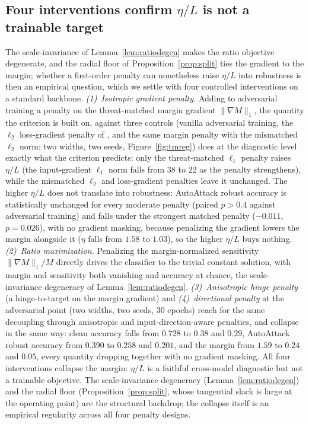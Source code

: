 \documentclass{article}
\theoremstyle{definition}
\begin{document}
\subsection{Four interventions confirm $\eta/L$ is not a trainable target}\label{app:tmreg}
The scale-invariance of Lemma~\ref{lem:ratiodegen} makes the ratio objective degenerate, and the radial floor of Proposition~\ref{prop:split} ties the gradient to the margin; whether a first-order penalty can nonetheless raise $\eta/L$ into robustness is then an empirical question, which we settle with four controlled interventions on a standard backbone. \emph{(1)~Isotropic gradient penalty.} Adding to adversarial training a penalty on the threat-matched margin gradient $\|\nabla M\|_1$, the quantity the criterion is built on, against three controls (vanilla adversarial training, the $\ell_2$ loss-gradient penalty of \citet{ross2018improving,finlay2021scaleable}, and the same margin penalty with the mismatched $\ell_2$ norm; two widths, two seeds, Figure~\ref{fig:tmreg}) does at the diagnostic level exactly what the criterion predicts: only the threat-matched $\ell_1$ penalty raises $\eta/L$ (the input-gradient $\ell_1$ norm falls from $38$ to $22$ as the penalty strengthens), while the mismatched $\ell_2$ and loss-gradient penalties leave it unchanged. The higher $\eta/L$ does not translate into robustness: AutoAttack robust accuracy is statistically unchanged for every moderate penalty (paired $p>0.4$ against adversarial training) and falls under the strongest matched penalty ($-0.011$, $p=0.026$), with no gradient masking, because penalizing the gradient lowers the margin alongside it ($\eta$ falls from $1.58$ to $1.03$), so the higher $\eta/L$ buys nothing. \emph{(2)~Ratio maximization.} Penalizing the margin-normalized sensitivity $\|\nabla M\|_1/M$ directly drives the classifier to the trivial constant solution, with margin and sensitivity both vanishing and accuracy at chance, the scale-invariance degeneracy of Lemma~\ref{lem:ratiodegen}. \emph{(3)~Anisotropic hinge penalty} (a hinge-to-target on the margin gradient) and \emph{(4)~directional penalty} at the adversarial point (two widths, two seeds, $30$ epochs) reach for the same decoupling through anisotropic and input-direction-aware penalties, and collapse in the same way: clean accuracy falls from $0.728$ to $0.38$ and $0.29$, AutoAttack robust accuracy from $0.390$ to $0.258$ and $0.201$, and the margin from $1.59$ to $0.24$ and $0.05$, every quantity dropping together with no gradient masking. All four interventions collapse the margin: $\eta/L$ is a faithful cross-model diagnostic but not a trainable objective. The scale-invariance degeneracy (Lemma~\ref{lem:ratiodegen}) and the radial floor (Proposition~\ref{prop:split}, whose tangential slack is large at the operating point) are the structural backdrop; the collapse itself is an empirical regularity across all four penalty designs.
\end{document}
